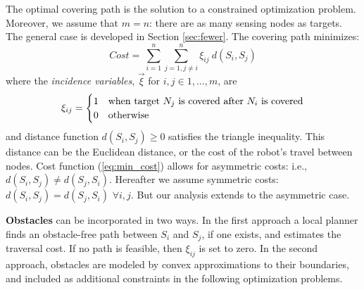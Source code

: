 \documentclass[letterpaper, 10 pt, conference]{ieeeconf}
\theoremstyle{definition}
\begin{document}
The optimal covering path is the solution to a constrained optimization problem. Moreover, we assume that $m=n$: there are as many sensing nodes as targets. The general case is developed in Section \ref{sec:fewer}.  The covering path minimizes:
  \begin{equation}\label{eq:min_cost}
     Cost =  \ \sum_{i=1}^n \sum_{j=1,j\ne i}^n \xi_{ij}\ d(S_i,S_j)
  \end{equation}
where the {\em incidence variables}, $\vec{\xi}$ for $i,j\in 1,\ldots,m$, are
  \[ \xi_{ij} = \begin{cases} 1 & {\rm when\ target\ } N_j\
                  {\rm is\ covered\ after}\ N_i\ {\rm is\ covered} \\
                              0 & {\rm otherwise} \end{cases} \]
and distance function $d(S_i,S_j)\ge 0$ satisfies the triangle inequality.  This distance can be the Euclidean distance, or the cost of the robot's travel between nodes.  Cost function (\ref{eq:min_cost}) allows for asymmetric costs: i.e., $d(S_i,S_j)\ne d(S_j,S_i)$.  Hereafter we assume symmetric costs: $d(S_i,S_j)=d(S_j,S_i)$ $\forall i,j$.  But our analysis extends to the asymmetric case.

{\bf Obstacles} can be incorporated in two ways. In the first approach a local planner finds an obstacle-free path between $S_i$ and $S_j$, if one exists, and estimates the traversal cost. If no path is feasible, then $\xi_{ij}$ is set to zero. In the second approach, obstacles are modeled  by convex approximations to their boundaries, and included as additional constraints in the following optimization problems.  
\end{document}
